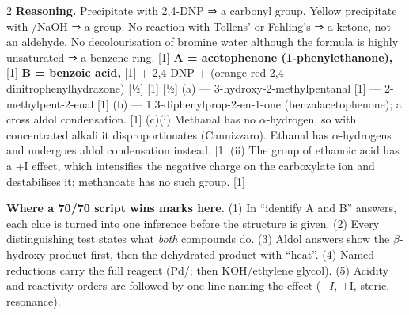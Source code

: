 \documentclass[10pt,a4paper]{extarticle}
\newcommand{\mk}[1]{{\scriptsize\color{black!55}[#1]}}
\begin{document}
\begin{multicols}{2}
\An \textbf{Reasoning.} Precipitate with 2,4-DNP ⇒ a carbonyl group. Yellow precipitate with /NaOH ⇒ a  group. No reaction with Tollens' or Fehling's ⇒ a ketone, not an aldehyde. No decolourisation of bromine water although the formula is highly unsaturated ⇒ a benzene ring. \mk{1}\nl
\textbf{A = acetophenone (1-phenylethanone), } \mk{1}\nl
\textbf{B = benzoic acid, } \mk{1}\nl
{} + 2,4-DNP \ce{->}\nl {} +  (orange-red 2,4-dinitrophenylhydrazone) \mk{½}\nl
{} \mk{1}\nl
{} \mk{½}
\An (a) \nl {} — 3-hydroxy-2-methylpentanal \mk{1}\nl
{} — 2-methylpent-2-enal \mk{1}\nl
(b) \nl {} — 1,3-diphenylprop-2-en-1-one (benzalacetophenone); a cross aldol condensation. \mk{1}\nl
(c)(i) Methanal has no $\alpha$-hydrogen, so with concentrated alkali it disproportionates (Cannizzaro). Ethanal has $\alpha$-hydrogens and undergoes aldol condensation instead. \mk{1}\nl
(ii) The  group of ethanoic acid has a +I effect, which intensifies the negative charge on the carboxylate ion and destabilises it; methanoate has no such group. \mk{1}
\end{multicols}
\begin{tcolorbox}[enhanced,colback=tipY,colframe=tipYframe,boxrule=0.5pt,arc=1.5pt,left=4pt,right=4pt,top=2pt,bottom=2pt,before skip=4pt]
\footnotesize\textbf{Where a 70/70 script wins marks here.} (1) In ``identify A and B'' answers, each clue is turned into one inference before the structure is given. (2) Every distinguishing test states what \emph{both} compounds do. (3) Aldol answers show the $\beta$-hydroxy product first, then the dehydrated product with ``heat''. (4) Named reductions carry the full reagent (Pd/;  then KOH/ethylene glycol). (5) Acidity and reactivity orders are followed by one line naming the effect ($-I$, +I, steric, resonance).
\end{tcolorbox}
\end{document}
